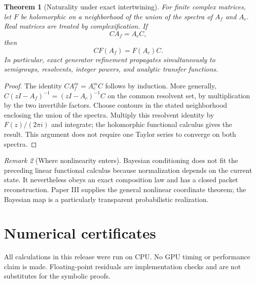 \documentclass[11pt]{article}
\newtheorem{theorem}{Theorem}[section]
\theoremstyle{definition}
\theoremstyle{remark}
\newtheorem{remark}[theorem]{Remark}
\begin{document}
\begin{theorem}[Naturality under exact intertwining]
For finite complex matrices, let $F$ be holomorphic on a neighborhood of the union of the spectra of $A_f$ and $A_c$. Real matrices are treated by complexification. If
\[
CA_f=A_cC,
\]
then
\[
\boxed{CF(A_f)=F(A_c)C.}
\]
In particular, exact generator refinement propagates simultaneously to semigroups, resolvents, integer powers, and analytic transfer functions.
\end{theorem}

\begin{proof}
The identity $CA_f^m=A_c^mC$ follows by induction. More generally, $C(zI-A_f)^{-1}=(zI-A_c)^{-1}C$ on the common resolvent set, by multiplication by the two invertible factors. Choose contours in the stated neighborhood enclosing the union of the spectra. Multiply this resolvent identity by $F(z)/(2\pi i)$ and integrate; the holomorphic functional calculus gives the result. This argument does not require one Taylor series to converge on both spectra.
\end{proof}

\begin{remark}[Where nonlinearity enters]
Bayesian conditioning does not fit the preceding linear functional calculus because normalization depends on the current state. It nevertheless obeys an exact composition law and has a closed packet reconstruction. Paper III supplies the general nonlinear coordinate theorem; the Bayesian map is a particularly transparent probabilistic realization.
\end{remark}

\section{Numerical certificates}

All calculations in this release were run on CPU. No GPU timing or performance claim is made. Floating-point residuals are implementation checks and are not substitutes for the symbolic proofs.
\end{document}
